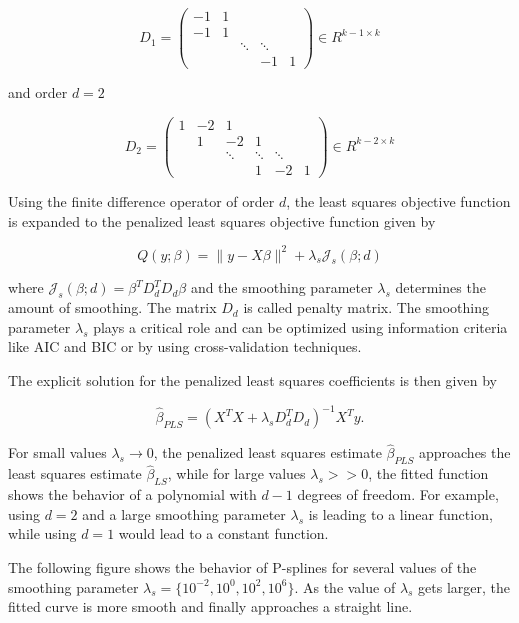 \documentclass[10pt,a4paper]{article}
\begin{document}
	$$D_1 = \begin{pmatrix} 
					-1& 1 &  & & \\  
					-1& 1 &  & & \\  
					  &   & \ddots & \ddots & \\ 
					  &   &  & -1 & 1 
			\end{pmatrix} \in R^{k-1\times k}$$
	
	and order $d=2$
	
	$$D_2 = \begin{pmatrix} 
				1& -2& 1& &    \\  
				 & 1 & -2 & 1& \\ 
				 &  & \ddots & \ddots  & \ddots \\ 
				 & & & 1 & -2 & 1 
			\end{pmatrix} \in R^{k-2\times k}$$
	
	Using the finite difference operator of order $d$, the least squares objective function is expanded to the penalized least squares objective function given by
	
	$$Q(y; \beta) = \lVert y - X\beta \rVert^2 + \lambda_s \mathcal J_s(\beta; d)$$
	
	where $\mathcal J_s(\beta; d) = \beta^T D_d^T D_d \beta$ and the smoothing parameter $\lambda_s$ determines the amount of smoothing. The matrix $D_d$ is called penalty matrix. The smoothing parameter $\lambda_s$ plays a critical role and can be optimized using information criteria like AIC and BIC or by using cross-validation techniques. 
	
	The explicit solution for the penalized least squares coefficients is then given by
	
	$$\hat \beta_{PLS} = (X^TX + \lambda_s D_d^TD_d)^{-1} X^T y.$$
	
	For small values $\lambda_s \rightarrow 0$, the penalized least squares estimate $\hat \beta_{PLS}$ approaches the least squares estimate $\hat \beta_{LS}$, while for large values $\lambda_s >> 0$, the fitted function shows the behavior of a polynomial with $d-1$ degrees of freedom. For example, using $d=2$ and a large smoothing parameter $\lambda_s$ is leading to a linear function, while using $d=1$ would lead to a constant function.
	
	The following figure shows the behavior of P-splines for several values of the smoothing parameter $\lambda_s = \{10^{-2}, 10^{0},10^{2},10^{6}\}.$  As the value of $\lambda_s$ gets larger, the fitted curve is more smooth and finally approaches a straight line.
	
\end{document}

